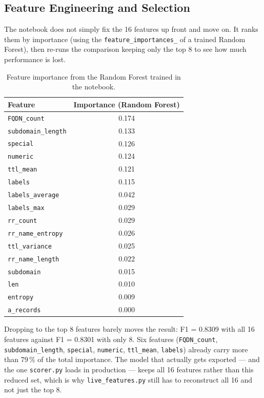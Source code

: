 \subsection*{Feature Engineering and Selection}
The notebook does not simply fix the 16 features up front and move on. It
ranks them by importance (using the \texttt{feature\_importances\_} of a
trained Random Forest), then re-runs the comparison keeping only the top 8
to see how much performance is lost.

\begin{table}[h]
\centering
\small
\begin{tabular}{@{}lc@{}}
\toprule
\textbf{Feature} & \textbf{Importance (Random Forest)} \\
\midrule
\texttt{FQDN\_count}        & 0.174 \\
\texttt{subdomain\_length}  & 0.133 \\
\texttt{special}            & 0.126 \\
\texttt{numeric}            & 0.124 \\
\texttt{ttl\_mean}          & 0.121 \\
\texttt{labels}             & 0.115 \\
\texttt{labels\_average}    & 0.042 \\
\texttt{labels\_max}        & 0.029 \\
\texttt{rr\_count}          & 0.029 \\
\texttt{rr\_name\_entropy}  & 0.026 \\
\texttt{ttl\_variance}      & 0.025 \\
\texttt{rr\_name\_length}   & 0.022 \\
\texttt{subdomain}          & 0.015 \\
\texttt{len}                & 0.010 \\
\texttt{entropy}            & 0.009 \\
\texttt{a\_records}         & 0.000 \\
\bottomrule
\end{tabular}
\caption{Feature importance from the Random Forest trained in the notebook.}
\end{table}

Dropping to the top 8 features barely moves the result: F1 = 0.8309 with all
16 features against F1 = 0.8301 with only 8. Six features
(\texttt{FQDN\_count}, \texttt{subdomain\_length}, \texttt{special},
\texttt{numeric}, \texttt{ttl\_mean}, \texttt{labels}) already carry more
than 79\,\% of the total importance. The model that actually gets exported
--- and the one \texttt{scorer.py} loads in production --- keeps all 16
features rather than this reduced set, which is why \texttt{live\_features.py}
still has to reconstruct all 16 and not just the top 8.

